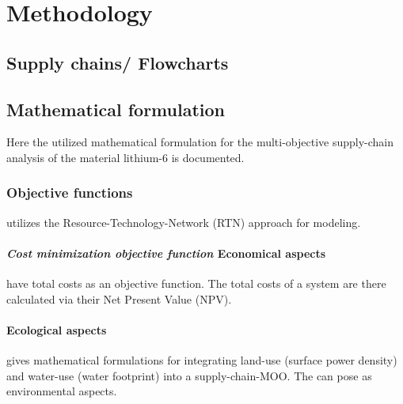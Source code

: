 \chapter{Methodology} 
\label{chap_method}


\section{Supply chains/ Flowcharts} 
\label{sec_supply_chains}

\section{Mathematical formulation}
\label{sec_mathematical_formulation}
Here the utilized mathematical formulation for the multi-objective supply-chain analysis of the material lithium-6 is documented.

\subsection{Objective functions} 
\label{subsec_objective_functions}
\textcite{farajiamiriMultiobjectiveOptimizationRenewable2023} utilizes the Resource-Technology-Network (RTN) approach for modeling. 

    \subsubsection{\textit{Cost minimization objective function} Economical aspects} 
    \label{subsec_economical_aspects}
    \textcite{farajiamiriMultiobjectiveOptimizationRenewable2023} have total costs as an objective function. The total costs of a system are there calculated via their Net Present Value (NPV).

    \subsubsection{Ecological aspects} 
    \label{subsec_ecological_aspects}
    \textcite{farajiamiriMultiobjectiveOptimizationRenewable2023} gives mathematical formulations for integrating land-use (surface power density) and water-use (water footprint) into a supply-chain-MOO. The can pose as environmental aspects. 


